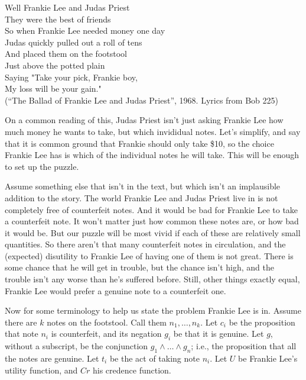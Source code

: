 \documentclass[11pt,]{book}
\begin{document}
Well Frankie Lee and Judas Priest\\
They were the best of friends\\
So when Frankie Lee needed money one day\\
Judas quickly pulled out a roll of tens\\
And placed them on the footstool\\
Just above the potted plain\\
Saying "Take your pick, Frankie boy,\\
My loss will be your gain."\\
\hspace*{0.333em}\hspace*{0.333em}\hspace*{0.333em}\hspace*{0.333em}\hspace*{0.333em}\hspace*{0.333em}\hspace*{0.333em}\hspace*{0.333em}\hspace*{0.333em}\hspace*{0.333em}(``The Ballad of Frankie Lee and Judas Priest'', 1968. Lyrics from Bob \citet{Dylan2016} 225)

On a common reading of this, Judas Priest isn't just asking Frankie Lee how much money he wants to take, but which invididual notes. Let's simplify, and say that it is common ground that Frankie should only take \$10, so the choice Frankie Lee has is which of the individual notes he will take. This will be enough to set up the puzzle.

Assume something else that isn't in the text, but which isn't an implausible addition to the story. The world Frankie Lee and Judas Priest live in is not completely free of counterfeit notes. And it would be bad for Frankie Lee to take a counterfeit note. It won't matter just how common these notes are, or how bad it would be. But our puzzle will be most vivid if each of these are relatively small quantities. So there aren't that many counterfeit notes in circulation, and the (expected) disutility to Frankie Lee of having one of them is not great. There is some chance that he will get in trouble, but the chance isn't high, and the trouble isn't any worse than he's suffered before. Still, other things exactly equal, Frankie Lee would prefer a genuine note to a counterfeit one.

Now for some terminology to help us state the problem Frankie Lee is in. Assume there are \(k\) notes on the footstool. Call them \(n_1, \dots, n_k\). Let \(c_i\) be the proposition that note \(n_i\) is counterfeit, and its negation \(g_i\) be that it is genuine. Let \(g\), without a subscript, be the conjunction \(g_1 \wedge \dots \wedge g_n\); i.e., the proposition that all the notes are genuine. Let \(t_i\) be the act of taking note \(n_i\). Let \(U\) be Frankie Lee's utility function, and \(Cr\) his credence function.
\end{document}
